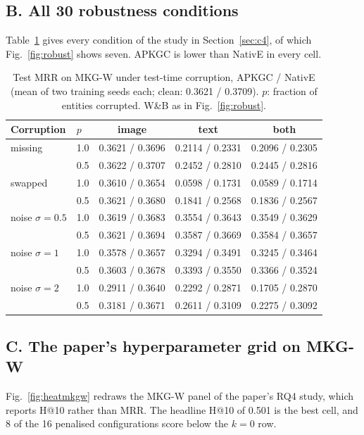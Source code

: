 \documentclass[conference,a4paper]{IEEEtran}
\begin{document}
\subsection*{B. All 30 robustness conditions}
Table~\ref{tab:robustall} gives every condition of the study in Section~\ref{sec:c4}, of which
Fig.~\ref{fig:robust} shows seven. APKGC is lower than NativE in every cell.

\begin{table}[!h]
\centering
\caption{Test MRR on MKG-W under test-time corruption, APKGC / NativE (mean of two training seeds each; clean: 0.3621 / 0.3709). $p$: fraction of entities corrupted. W\&B as in Fig.~\ref{fig:robust}.}
\label{tab:robustall}
\scriptsize
\setlength{\tabcolsep}{2.5pt}
\begin{tabular}{llccc}
\toprule
Corruption & $p$ & image & text & both\\
\midrule
missing & 1.0 & 0.3621 / 0.3696 & 0.2114 / 0.2331 & 0.2096 / 0.2305\\
 & 0.5 & 0.3622 / 0.3707 & 0.2452 / 0.2810 & 0.2445 / 0.2816\\
swapped & 1.0 & 0.3610 / 0.3654 & 0.0598 / 0.1731 & 0.0589 / 0.1714\\
 & 0.5 & 0.3621 / 0.3680 & 0.1841 / 0.2568 & 0.1836 / 0.2567\\
noise $\sigma{=}0.5$ & 1.0 & 0.3619 / 0.3683 & 0.3554 / 0.3643 & 0.3549 / 0.3629\\
 & 0.5 & 0.3621 / 0.3694 & 0.3587 / 0.3669 & 0.3584 / 0.3657\\
noise $\sigma{=}1$ & 1.0 & 0.3578 / 0.3657 & 0.3294 / 0.3491 & 0.3245 / 0.3464\\
 & 0.5 & 0.3603 / 0.3678 & 0.3393 / 0.3550 & 0.3366 / 0.3524\\
noise $\sigma{=}2$ & 1.0 & 0.2911 / 0.3640 & 0.2292 / 0.2871 & 0.1705 / 0.2870\\
 & 0.5 & 0.3181 / 0.3671 & 0.2611 / 0.3109 & 0.2275 / 0.3092\\
\bottomrule
\end{tabular}
\end{table}

\subsection*{C. The paper's hyperparameter grid on MKG-W}
Fig.~\ref{fig:heatmkgw} redraws the MKG-W panel of the paper's RQ4 study, which reports
H@10 rather than MRR. The headline H@10 of 0.501 is the best cell, and 8 of the 16 penalised
configurations score below the $k=0$ row.
\end{document}
